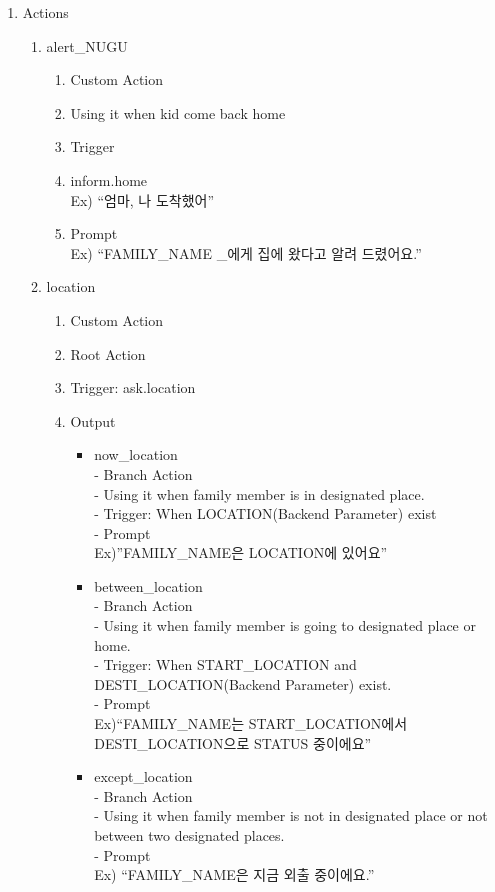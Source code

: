 \documentclass[conference]{IEEEtran}
\begin{document}
\begin{enumerate}
   \item Actions
   \begin{enumerate}
       \item alert\_NUGU
       \begin{enumerate}
           \item Custom Action
           \item Using it when kid come back home
           \item Trigger
           \item inform.home \\ Ex) “엄마, 나 도착했어”
           \item Prompt \\ Ex) “{{FAMILY\_NAME
           \_}}에게 집에 왔다고 알려 드렸어요.”
       \end{enumerate}
       \item location
       \begin{enumerate}
           \item Custom Action
           \item Root Action
           \item Trigger: ask.location
           \item Output
           \begin{itemize}
               \item now\_location\\
               - Branch Action\\
               - Using it when family member is in designated place.\\
               - Trigger: When LOCATION(Backend Parameter) exist\\
               - Prompt\\
               Ex)”{{FAMILY\_NAME}}은 {{LOCATION}}에 있어요”\\
               \item between\_location\\
               - Branch Action\\
               - Using it when family member is going to designated place or home.\\
               - Trigger: When START\_LOCATION and DESTI\_LOCATION(Backend Parameter) exist.\\
               - Prompt\\
               Ex)“{{FAMILY\_NAME}}는 {{START\_LOCATION}}에서 {{DESTI\_LOCATION}}으로 {{STATUS}} 중이에요”\\
                \item except\_location\\
                - Branch Action\\
                - Using it when family member is not in designated place or not between two designated places.\\
                - Prompt\\
                Ex) “{{FAMILY\_NAME}}은 지금 외출 중이에요.” \\
           \end{itemize}
       \end{enumerate}
   \end{enumerate}
\end{enumerate}
\end{document}
